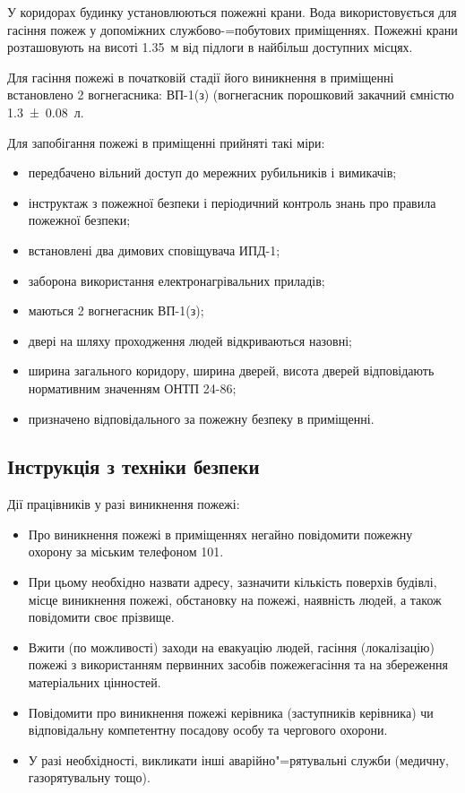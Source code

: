 \documentclass[simple,14pt,utf8,ukrainian]{eskdtext}
\begin{document}
      У коридорах будинку установлюються пожежні крани.
      Вода використовується для гасіння пожеж у допоміжних службово-=побутових
      приміщеннях.
      Пожежні крани розташовують на висоті \num{1.35}~м від підлоги в найбільш
      доступних місцях.

      Для гасіння пожежі в початковій стадії його виникнення в приміщенні
      встановлено 2 вогнегасника: ВП-1(з) (вогнегасник порошковий закачний
      ємністю \num{1.3+-0.08}~л.

      Для запобігання пожежі в приміщенні прийняті такі міри:
      \begin{itemize}
        \item передбачено вільний доступ до мережних рубильників і вимикачів;
        \item інструктаж з пожежної безпеки і періодичний контроль знань про
          правила пожежної безпеки;
        \item встановлені два димових сповіщувача ИПД-1;
        \item заборона використання електронагрівальних приладів;
        \item маються 2 вогнегасник ВП-1(з);
        \item двері на шляху проходження людей відкриваються назовні;
        \item ширина загального коридору, ширина дверей, висота дверей
          відповідають нормативним значенням ОНТП 24-86;
        \item призначено відповідального за пожежну безпеку в приміщенні.
      \end{itemize}
  \subsection{Інструкція з техніки безпеки}
    Дії працівників у разі виникнення пожежі:
    \begin{itemize}
      \item Про виникнення пожежі в приміщеннях негайно повідомити пожежну
        охорону за міським телефоном 101.
      \item При цьому необхідно назвати адресу, зазначити кількість поверхів
        будівлі, місце виникнення пожежі, обстановку на пожежі, наявність
        людей, а також повідомити своє прізвище.
      \item Вжити (по можливості) заходи на евакуацію людей, гасіння
        (локалізацію) пожежі з використанням первинних засобів пожежегасіння
        та на збереження матеріальних цінностей.
      \item Повідомити про виникнення пожежі керівника (заступників керівника)
        чи відповідальну компетентну посадову особу та чергового охорони.
      \item У разі необхідності, викликати інші аварійно"=рятувальні служби
        (медичну, газорятувальну тощо).
    \end{itemize}
  
  
\end{document}
